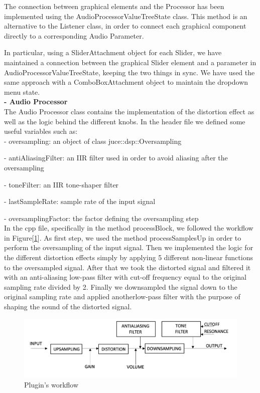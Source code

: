 \documentclass[letterpaper, 12pt]{article}
\begin{document}
	The connection between graphical elements and the Processor has been implemented using the AudioProcessorValueTreeState class. This method is an alternative to the Listener class, in order to connect each graphical component directly to a corresponding Audio Parameter.
	
	In particular, using  a SliderAttachment object for each Slider, we have maintained a connection between the graphical Slider element and a parameter in AudioProcessorValueTreeState, keeping the two things in sync. We have used the same approach with a ComboBoxAttachment object to maintain the dropdown menu state.
	\\
	
	\textbf{-	Audio Processor }\\
	
	The Audio Processor class contains the implementation of the distortion effect as well as the logic behind the different knobs.
	In the header file we defined some useful variables such as:
	\\
	
	-	oversampling: an object of class juce::dsp::Oversampling
	
	-	antiAliasingFilter: an IIR filter used in order to avoid aliasing after the oversampling
	
	-	toneFilter: an IIR tone-shaper filter
	
	-	lastSampleRate: sample rate of the input signal
	
	-	oversamplingFactor: the factor defining the oversampling step
	\\
	
	In the cpp file, specifically in the method processBlock, we followed the workflow in Figure[\ref{fig:workflow}].  As first step, we used the method processSamplesUp in order to perform the oversampling of the input signal.
	Then we implemented the logic for the different distortion effects simply by applying 5 different non-linear functions to the oversampled signal.
	After that we took the distorted signal and filtered it with an anti-aliasing low-pass filter with cut-off frequency equal to the original sampling rate divided by 2.
	Finally we downsampled the signal down to the original sampling rate and applied anotherlow-pass filter with the purpose of shaping the sound of the distorted signal.  
	
	\begin{figure}[h!]
		\includegraphics[scale=0.5]{workflow.png}
		\centering
		\caption{Plugin's workflow}
		\label{fig:workflow}
	\end{figure}
\end{document}
